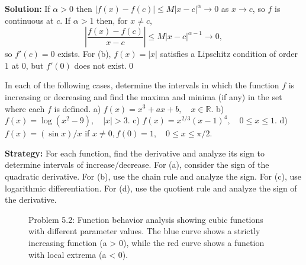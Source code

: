 \bigskip\noindent\textbf{Solution:}
If $\alpha>0$ then $|f(x)-f(c)|\le M|x-c|^{\alpha}\to 0$ as $x\to c$, so $f$ is continuous at $c$. If $\alpha>1$ then, for $x\ne c$,
\[\left|\frac{f(x)-f(c)}{x-c}\right|\le M|x-c|^{\alpha-1}\to 0,\]
so $f'(c)=0$ exists. For (b), $f(x)=|x|$ satisfies a Lipschitz condition of order $1$ at $0$, but $f'(0)$ does not exist.\qed


\begin{problembox}
\begin{problemstatement}
In each of the following cases, determine the intervals in which the function \( f \) is increasing or decreasing and find the maxima and minima (if any) in the set where each \( f \) is defined.
a) \( f(x) = x^3 + ax + b, \quad x \in \mathbb{R} \).
b) \( f(x) = \log (x^2 - 9), \quad |x| > 3 \).
c) \( f(x) = x^{2/3}(x - 1)^4, \quad 0 \leq x \leq 1 \).
d) \( f(x) = (\sin x)/x \) if \( x \neq 0, f(0) = 1, \quad 0 \leq x \leq \pi /2 \).
\end{problemstatement}
\end{problembox}

\noindent\textbf{Strategy:} For each function, find the derivative and analyze its sign to determine intervals of increase/decrease. For (a), consider the sign of the quadratic derivative. For (b), use the chain rule and analyze the sign. For (c), use logarithmic differentiation. For (d), use the quotient rule and analyze the sign of the derivative.

\begin{figure}[h]
\centering
{}
\caption{Problem 5.2: Function behavior analysis showing cubic functions with different parameter values. The blue curve shows a strictly increasing function (a > 0), while the red curve shows a function with local extrema (a < 0).}
\end{figure}

